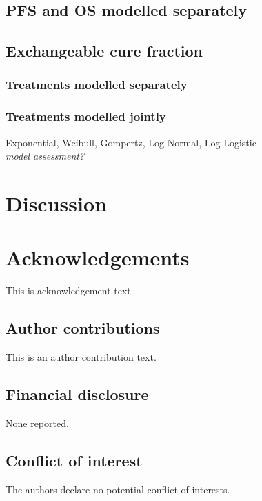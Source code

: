 \documentclass[AMA,STIX1COL]{WileyNJD-v2}
\begin{document}
\subsection{PFS and OS modelled separately}
\subsection{Exchangeable cure fraction}
\subsubsection{Treatments modelled separately}
\subsubsection{Treatments modelled jointly}

Exponential, Weibull, Gompertz, Log-Normal, Log-Logistic\\
{\it model assessment?}



\section{Discussion}\label{sec:discussion}




\section*{Acknowledgements}
This is acknowledgement text.

\subsection*{Author contributions}

This is an author contribution text.

\subsection*{Financial disclosure}

None reported.

\subsection*{Conflict of interest}

The authors declare no potential conflict of interests.
\end{document}
